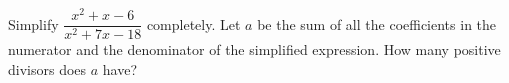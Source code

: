 Simplify $\dfrac{x^2+x-6}{x^2+7x-18}$ completely. Let $a$ be the sum of all the coefficients in the numerator and the denominator of the simplified expression. How many positive divisors does $a$ have?
